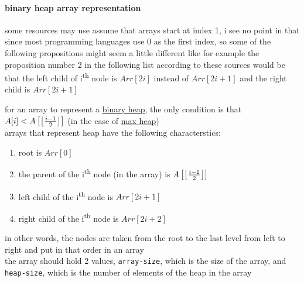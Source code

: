 \documentclass[a4paper,12pt]{article}
\DeclarePairedDelimiter\floor{\lfloor}{\rfloor}
\begin{document}
\paragraph{binary heap array representation}
\label{sec:org93e8c49}
\begin{note}
some resources may use assume that arrays start at index 1, i see no point in that since most programming languages use 0 as the first index, so some of the following propositions might seem a little different like for example the proposition number 2 in the following list according to these sources would be that the left child of i\textsuperscript{th} node is \(Arr[2i]\) instead of \(Arr[2i+1]\) and the right child is \(Arr[2i+1]\)\\[0pt]
\end{note}
for an array to represent a \hyperref[sec:orgff15739]{binary heap}, the only condition is that \(A[i] < A\left[\floor*{\frac{i-1}{2}}\right]\) (in the case of \hyperref[sec:org75e2e7b]{max heap})\\[0pt]
arrays that represent heap have the following characterstics:\\[0pt]
\begin{enumerate}
\item root is \(Arr[0]\)\\[0pt]
\item the parent of the i\textsuperscript{th} node (in the array) is \(A\left[\floor*{\frac{i-1}{2}}\right]\)\\[0pt]
\item left child of the i\textsuperscript{th} node is \(Arr[2i+1]\)\\[0pt]
\item right child of the i\textsuperscript{th} node is \(Arr[2i+2]\)\\[0pt]
\end{enumerate}
in other words, the nodes are taken from the root to the last level from left to right and put in that order in an array\\[0pt]
the array should hold 2 values, \texttt{array-size}, which is the size of the array, and \texttt{heap-size}, which is the number of elements of the heap in the array\\[0pt]
\end{document}
